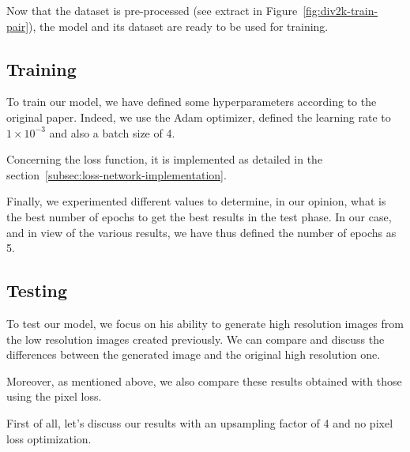 \documentclass{article}
\begin{document}
{{        Now that the dataset is pre-processed (see extract in Figure~\ref{fig:div2k-train-pair}), the model and its dataset are ready to be used for training.
    }

    {
        \subsection{Training}
        \label{subsec:training}

        To train our model, we have defined some hyperparameters according to the original paper. Indeed, we use the Adam optimizer, defined the learning rate to $1 \times 10^{-3}$ and also a batch size of 4.

        Concerning the loss function, it is implemented as detailed in the section~\ref{subsec:loss-network-implementation}.

        \bigskip

        Finally, we experimented different values to determine, in our opinion, what is the best number of epochs to get the best results in the test phase. In our case, and in view of the various results, we have thus defined the number of epochs as 5.
    }

    {
        \subsection{Testing}
        \label{subsec:testing}

        To test our model, we focus on his ability to generate high resolution images from the low resolution images created previously. We can compare and discuss the differences between the generated image and the original high resolution one.

        Moreover, as mentioned above, we also compare these results obtained with those using the pixel loss.

        \bigskip

        First of all, let's discuss our results with an upsampling factor of 4 and no pixel loss optimization.

}}
\end{document}
